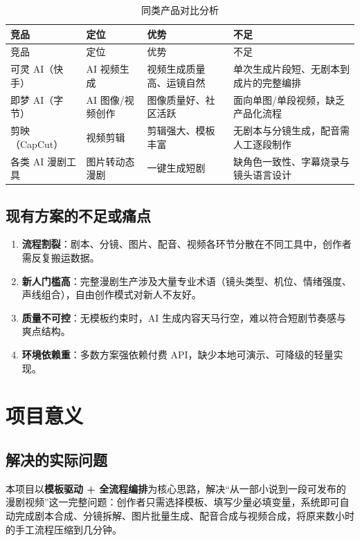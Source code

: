 \documentclass[12pt]{ctexrep}
\begin{document}
\begin{longtable}{p{3cm}p{3.4cm}p{4.4cm}p{5.2cm}}
\caption{同类产品对比分析}\label{tab:competitors}\\
\toprule
竞品 & 定位 & 优势 & 不足\\
\midrule
\endfirsthead
\toprule
竞品 & 定位 & 优势 & 不足\\
\midrule
\endhead
可灵 AI（快手） & AI 视频生成 & 视频生成质量高、运镜自然 & 单次生成片段短、无剧本到成片的完整编排\\
即梦 AI（字节） & AI 图像/视频创作 & 图像质量好、社区活跃 & 面向单图/单段视频，缺乏产品化流程\\
剪映（CapCut） & 视频剪辑 & 剪辑强大、模板丰富 & 无剧本与分镜生成，配音需人工逐段制作\\
各类 AI 漫剧工具 & 图片转动态漫剧 & 一键生成短剧 & 缺角色一致性、字幕烧录与镜头语言设计\\
\bottomrule
\end{longtable}

\subsection{现有方案的不足或痛点}

\begin{enumerate}
\item \textbf{流程割裂}：剧本、分镜、图片、配音、视频各环节分散在不同工具中，创作者需反复搬运数据。
\item \textbf{新人门槛高}：完整漫剧生产涉及大量专业术语（镜头类型、机位、情绪强度、声线组合），自由创作模式对新人不友好。
\item \textbf{质量不可控}：无模板约束时，AI 生成内容天马行空，难以符合短剧节奏感与爽点结构。
\item \textbf{环境依赖重}：多数方案强依赖付费 API，缺少本地可演示、可降级的轻量实现。
\end{enumerate}

\section{项目意义}
\subsection{解决的实际问题}

本项目以\textbf{模板驱动 + 全流程编排}为核心思路，解决“从一部小说到一段可发布的漫剧视频”这一完整问题：创作者只需选择模板、填写少量必填变量，系统即可自动完成剧本合成、分镜拆解、图片批量生成、配音合成与视频合成，将原来数小时的手工流程压缩到几分钟。
\end{document}
